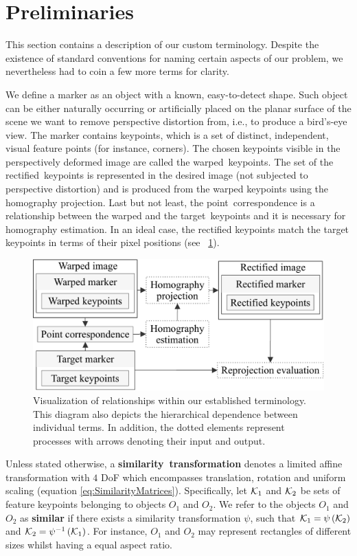 \section{Preliminaries}
\label{sec:HomographyPreliminaries}

This section contains a description of our custom terminology. Despite the existence of standard conventions for naming certain aspects of our problem, we nevertheless had to coin a few more terms for clarity.

We define a marker as an object with a known, easy-to-detect shape. Such object can be either naturally occurring or artificially placed on the planar surface of the scene we want to remove perspective distortion from, i.e., to produce a bird's-eye view. The marker contains keypoints, which is a set of distinct, independent, visual feature points (for instance, corners). The chosen keypoints visible in the perspectively deformed image are called the \mbox{warped keypoints}. The set of the \mbox{rectified keypoints} is represented in the desired image (not subjected to perspective distortion) and is produced from the warped keypoints using the homography projection. Last but not least, the \mbox{point correspondence} is a relationship between the warped and the \mbox{target keypoints} and it is necessary for homography estimation. In an ideal case, the rectified keypoints match the target keypoints in terms of their pixel positions (see \figstr{}~\ref{fig:HomographyTerminology}).

\begin{figure}[t]
    \centering
    \includegraphics[width=0.6\linewidth]{figures/homography/terminology.pdf}
    \caption{Visualization of relationships within our established terminology. This diagram also depicts the hierarchical dependence between individual terms. In addition, the dotted elements represent processes with arrows denoting their input and output.}
    \label{fig:HomographyTerminology}
\end{figure}

Unless stated otherwise, a \mbox{\textbf{similarity transformation}} denotes a limited affine transformation with $4$ DoF which encompasses translation, rotation and uniform scaling (equation \ref{eq:SimilarityMatrices}). Specifically, let $\mathcal{K}_1$ and $\mathcal{K}_2$ be sets of feature keypoints belonging to objects $O_1$ and $O_2$. We refer to the objects $O_1$ and $O_2$ as \mbox{\textbf{similar}} if there exists a similarity transformation $\psi$, such that $\mathcal{K}_1 = {\psi} \left( \mathcal{K}_2 \right)$ and $\mathcal{K}_2 = {\psi^{-1}} \left( \mathcal{K}_1 \right)$. For instance, $O_1$ and $O_2$ may represent rectangles of different sizes whilst having a equal aspect ratio.

